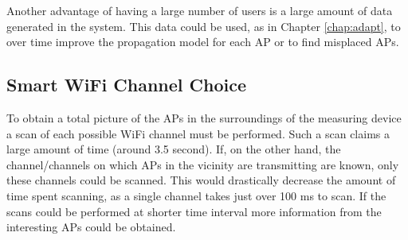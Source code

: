 \documentclass{LTHthesis}
\begin{document}
Another advantage of having a large number of users is a large amount of data generated in the system. This data could be used, as in Chapter \ref{chap:adapt}, to over time improve the propagation model for each AP or to find misplaced APs.     
%
\subsection{Smart WiFi Channel Choice}
%
To obtain a total picture of the APs in the surroundings of the measuring device a scan of each possible WiFi channel must be performed. Such a scan claims a large amount of time (around 3.5 second). If, on the other hand, the channel/channels on which APs in the vicinity are transmitting are known, only these channels could be scanned. This would drastically decrease the amount of time spent scanning, as a single channel takes just over 100 ms to scan. If the scans could be performed at shorter time interval more information from the interesting APs could be obtained.   
%
\printbibliography  %
\end{document}
